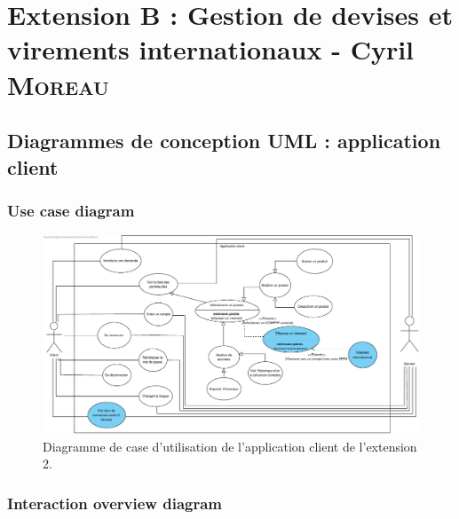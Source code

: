 \documentclass[]{report}
\begin{document}
\newpage





\chapter{Extension B : Gestion de devises et virements internationaux - Cyril \textsc{Moreau}}



\newpage



\section{Diagrammes de conception UML : application client}



\subsection{Use case diagram}

\begin{figure}[h]
	\centering\includegraphics[width=\linewidth]{img/Use Case Client - Extension 2.pdf}
	\caption{Diagramme de case d'utilisation de l'application client de l'extension 2.}
\end{figure}

\newpage

\subsection{Interaction overview diagram}
\end{document}
